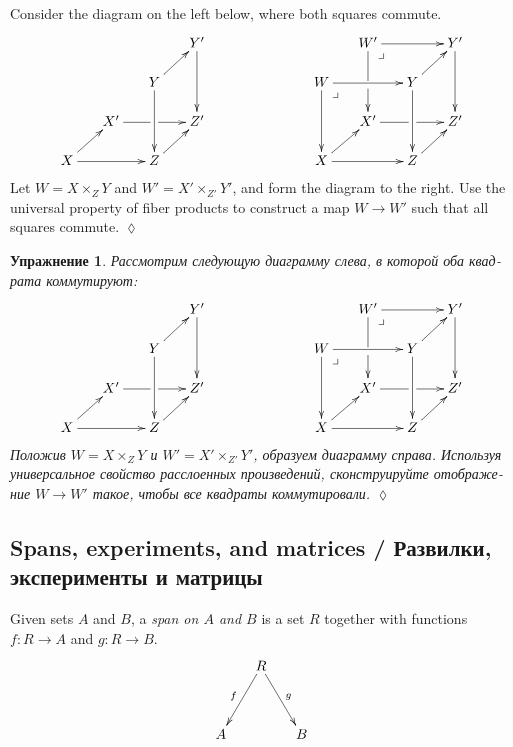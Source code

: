 \documentclass[a4paper]{book}
\makeatletter
\def\to{\rightarrow}
\def\taking{\colon}
\def\ullimit{\ar@{}[rd]|(.3)*+{\lrcorner}}
\theoremstyle{myth}
\newtheorem{excENG}[envENG]{\begin{english}Exercise\end{english}}
\newtheorem{definitionENG}[envENG]{\begin{english}Definition\end{english}}
\newenvironment{exerciseENG}{\begin{excENG}}{\hspace*{\fill}$\lozenge$\end{excENG}}
\newtheorem{excRUS}[envRUS]{Упражнение}
\newenvironment{exerciseRUS}{\begin{excRUS}}{\hspace*{\fill}$\lozenge$\end{excRUS}}
\makeatother
\begin{document}
\begin{russian}
\begin{exerciseENG}\label{exc:pointwise map of fp}
Consider the diagram on the left below, where both squares commute. 
$$
\xymatrix@=15pt{
&&&Y'\ar[dd]\\
&&Y\ar[ru]\ar[dd]\\
&X'\ar'[r][rr]&&Z'\\
X\ar[rr]\ar[ru]&&Z\ar[ru]
}
\hspace{1in}
\xymatrix@=15pt{
&W'\ar[rr]\ar'[d][dd]\ullimit&&Y'\ar[dd]\\
W\ar[rr]\ar[dd]\ullimit&&Y\ar[ru]\ar[dd]\\
&X'\ar'[r][rr]&&Z'\\
X\ar[rr]\ar[ru]&&Z\ar[ru]
}
$$
Let $W=X\times_ZY$ and $W'=X'\times_{Z'}Y'$, and form the diagram to the right. Use the universal property of fiber products to construct a map $W\to W'$ such that all squares commute.
\end{exerciseENG}

\begin{exerciseRUS}\label{exc:pointwise map of fp}
Рассмотрим следующую диаграмму слева, в которой оба квадрата коммутируют: 
$$
\xymatrix@=15pt{
&&&Y'\ar[dd]\\
&&Y\ar[ru]\ar[dd]\\
&X'\ar'[r][rr]&&Z'\\
X\ar[rr]\ar[ru]&&Z\ar[ru]
}
\hspace{1in}
\xymatrix@=15pt{
&W'\ar[rr]\ar'[d][dd]\ullimit&&Y'\ar[dd]\\
W\ar[rr]\ar[dd]\ullimit&&Y\ar[ru]\ar[dd]\\
&X'\ar'[r][rr]&&Z'\\
X\ar[rr]\ar[ru]&&Z\ar[ru]
}
$$
Положив $W=X\times_ZY$ и $W'=X'\times_{Z'}Y'$, образуем диаграмму справа. Используя универсальное свойство расслоенных произведений, сконструируйте отображение $W\to W'$ такое, чтобы все квадраты коммутировали.
\end{exerciseRUS}


\subsection{Spans, experiments, and matrices / Развилки, эксперименты и матрицы}

\begin{definitionENG}\label{def:span}
Given sets $A$ and $B$, a {\em span on $A$ and $B$} is a set $R$ together with functions $f\taking R\to A$ and $g\taking R\to B$. 
$$\xymatrix@=15pt{&R\ar[ddl]_f\ar[ddr]^g\\\\A&&B}$$
\end{definitionENG}


\end{russian}
\end{document}
